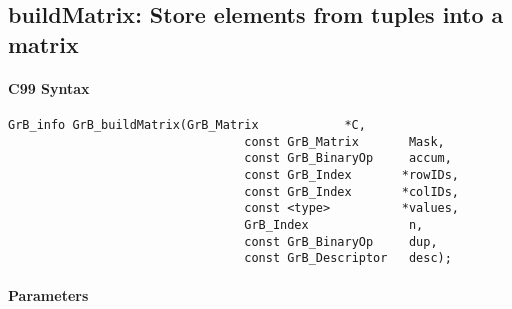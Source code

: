 \subsection{{\sf buildMatrix}: Store elements from tuples into a matrix}
\label{Sec:buildMatrix}

\paragraph{C99 Syntax}

\begin{Verbatim}[samepage=true]    
        GrB_info GrB_buildMatrix(GrB_Matrix            *C,
                                 const GrB_Matrix       Mask,
                                 const GrB_BinaryOp     accum,
                                 const GrB_Index       *rowIDs,
                                 const GrB_Index       *colIDs, 
                                 const <type>          *values,
                                 GrB_Index              n,
                                 const GrB_BinaryOp     dup,
                                 const GrB_Descriptor   desc);
\end{Verbatim}

\paragraph{Parameters}

